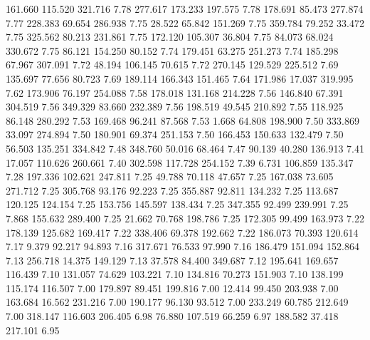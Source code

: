  161.660  115.520  321.716         7.78
 277.617  173.233  197.575         7.78
 178.691   85.473  277.874         7.77
 228.383   69.654  286.938         7.75
  28.522   65.842  151.269         7.75
 359.784   79.252   33.472         7.75
 325.562   80.213  231.861         7.75
 172.120  105.307   36.804         7.75
  84.073   68.024  330.672         7.75
  86.121  154.250   80.152         7.74
 179.451   63.275  251.273         7.74
 185.298   67.967  307.091         7.72
  48.194  106.145   70.615         7.72
 270.145  129.529  225.512         7.69
 135.697   77.656   80.723         7.69
 189.114  166.343  151.465         7.64
 171.986   17.037  319.995         7.62
 173.906   76.197  254.088         7.58
 178.018  131.168  214.228         7.56
 146.840   67.391  304.519         7.56
 349.329   83.660  232.389         7.56
 198.519   49.545  210.892         7.55
 118.925   86.148  280.292         7.53
 169.468   96.241   87.568         7.53
   1.668   64.808  198.900         7.50
 333.869   33.097  274.894         7.50
 180.901   69.374  251.153         7.50
 166.453  150.633  132.479         7.50
  56.503  135.251  334.842         7.48
 348.760   50.016   68.464         7.47
  90.139   40.280  136.913         7.41
  17.057  110.626  260.661         7.40
 302.598  117.728  254.152         7.39
   6.731  106.859  135.347         7.28
 197.336  102.621  247.811         7.25
  49.788   70.118   47.657         7.25
 167.038   73.605  271.712         7.25
 305.768   93.176   92.223         7.25
 355.887   92.811  134.232         7.25
 113.687  120.125  124.154         7.25
 153.756  145.597  138.434         7.25
 347.355   92.499  239.991         7.25
   7.868  155.632  289.400         7.25
  21.662   70.768  198.786         7.25
 172.305   99.499  163.973         7.22
 178.139  125.682  169.417         7.22
 338.406   69.378  192.662         7.22
 186.073   70.393  120.614         7.17
   9.379   92.217   94.893         7.16
 317.671   76.533   97.990         7.16
 186.479  151.094  152.864         7.13
 256.718   14.375  149.129         7.13
  37.578   84.400  349.687         7.12
 195.641  169.657  116.439         7.10
 131.057   74.629  103.221         7.10
 134.816   70.273  151.903         7.10
 138.199  115.174  116.507         7.00
 179.897   89.451  199.816         7.00
  12.414   99.450  203.938         7.00
 163.684   16.562  231.216         7.00
 190.177   96.130   93.512         7.00
 233.249   60.785  212.649         7.00
 318.147  116.603  206.405         6.98
  76.880  107.519   66.259         6.97
 188.582   37.418  217.101         6.95
